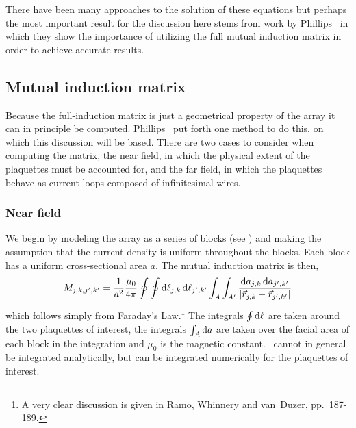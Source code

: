 There have been many approaches to the solution of these equations
\cite{ebner_prb_31_165_1985,auletta_prb_47_14326_1993,%
auletta_prb_51_12844_1995,%
chandran_prb_56_6169_1997,%
filatrella_epjb_12_23_1999,lucheroni_prb_55_6559_1997} but perhaps
the most important result for the discussion here stems from work
by Phillips \etal \cite{phillips_prb_47_5219_1993}\ in which they 
show the importance of utilizing the full mutual induction matrix in order
to achieve accurate results. 

\subsection{Mutual induction matrix}

Because the full-induction matrix is just a geometrical property 
of the array it can in principle be computed. Phillips \etal\ put
forth one method to do this, on which this discussion will be based. 
There are two cases to consider when computing the matrix, the near
field, in which the physical extent of the plaquettes must be accounted 
for, and the far field, in which the plaquettes behave as current loops
composed of infinitesimal wires. 

\subsubsection{Near field}

We begin by modeling the array as a series of blocks (see 
) and making 
the assumption
that the current density is uniform throughout the blocks.
Each block has
a uniform cross-sectional area $a$. The mutual induction matrix is then,
%
\begin{equation}
\label{eqn:analytic_mutual_induction}
M_{j,k,j',k'} = {1\over a^2} {\mu_0\over 4 \pi} \oint\oint \mathrm{d}\ell_{j,k}\,
  \mathrm{d}\ell_{j',k'} 
  \int_A\int_{A'} {\mathrm{d} a_{j,k}\, \mathrm{d} a_{j',k'} \over \left|\vec r_{j,k} 
    - \vec r_{j',k'}\right|}
\end{equation}
%
which follows simply from Faraday's Law.\footnote{A very clear discussion
is given in Ramo, Whinnery and van~Duzer\cite{ramo_whinnery_vanduzer}, 
pp.~187-189.}
The integrals $\oint \mathrm{d}\ell$ are taken around the two plaquettes 
of interest, the integrals $\int_A \mathrm{d} a$ are taken over the facial area of
each block in the integration and $\mu_0$ is the magnetic constant.
\ 
cannot in general be integrated analytically, but can be integrated 
numerically
for the plaquettes of interest. 

